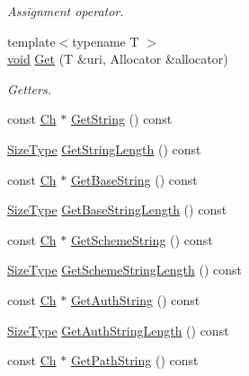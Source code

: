 \begin{DoxyCompactItemize}
\begin{DoxyCompactList}\small\item\em Assignment operator. \end{DoxyCompactList}\item 
{\footnotesize template$<$typename T $>$ }\\\hyperlink{imgui__impl__opengl3__loader_8h_ac668e7cffd9e2e9cfee428b9b2f34fa7}{void} \hyperlink{classGenericUri_ae3d2e835bd683e41720379260c2f1e04}{Get} (T \&uri, Allocator \&allocator)
\begin{DoxyCompactList}\small\item\em Getters. \end{DoxyCompactList}\item 
const \hyperlink{classGenericUri_a20d0602cff62211d89bc4b25963beeee}{Ch} $\ast$ \hyperlink{classGenericUri_a14b9fd6884cf1d18a126907e83337cee}{Get\+String} () const
\item 
\hyperlink{rapidjson_8h_a5ed6e6e67250fadbd041127e6386dcb5}{Size\+Type} \hyperlink{classGenericUri_ad8f54ebb7d47030b4b0900b6987d76f7}{Get\+String\+Length} () const
\item 
const \hyperlink{classGenericUri_a20d0602cff62211d89bc4b25963beeee}{Ch} $\ast$ \hyperlink{classGenericUri_aba5afd6c680598660fa74c5b4107c563}{Get\+Base\+String} () const
\item 
\hyperlink{rapidjson_8h_a5ed6e6e67250fadbd041127e6386dcb5}{Size\+Type} \hyperlink{classGenericUri_a87075603b398cc925d04180343443aca}{Get\+Base\+String\+Length} () const
\item 
const \hyperlink{classGenericUri_a20d0602cff62211d89bc4b25963beeee}{Ch} $\ast$ \hyperlink{classGenericUri_ab692ff35e7bf2363adcc16f03c3ebc62}{Get\+Scheme\+String} () const
\item 
\hyperlink{rapidjson_8h_a5ed6e6e67250fadbd041127e6386dcb5}{Size\+Type} \hyperlink{classGenericUri_ac3337c9af8f61c56301e2c51b9c03183}{Get\+Scheme\+String\+Length} () const
\item 
const \hyperlink{classGenericUri_a20d0602cff62211d89bc4b25963beeee}{Ch} $\ast$ \hyperlink{classGenericUri_af9b39ae6698d523c715d73fbddfcaa27}{Get\+Auth\+String} () const
\item 
\hyperlink{rapidjson_8h_a5ed6e6e67250fadbd041127e6386dcb5}{Size\+Type} \hyperlink{classGenericUri_a6c7e9223173511e2c8addf0a5fbb4719}{Get\+Auth\+String\+Length} () const
\item 
const \hyperlink{classGenericUri_a20d0602cff62211d89bc4b25963beeee}{Ch} $\ast$ \hyperlink{classGenericUri_ac49bd4ca9eb8ea2533dfb97f2318d8c4}{Get\+Path\+String} () const

\end{DoxyCompactItemize}
